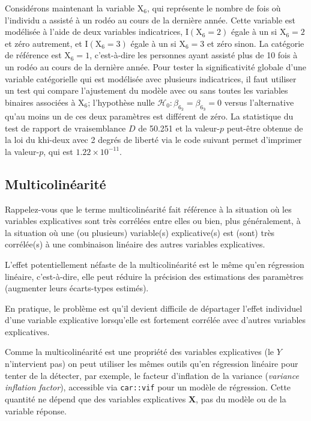 \documentclass[
  11pt,
  letterpaper,
]{scrbook}
\theoremstyle{definition}
\theoremstyle{remark}
\begin{document}
Considérons maintenant la variable \(\mathrm{X}_6\), qui représente le
nombre de fois où l'individu a assisté à un rodéo au cours de la
dernière année. Cette variable est modélisée à l'aide de deux variables
indicatrices, \(\mathrm{I}(\mathrm{X}_6=2)\) égale à un si
\(\mathrm{X}_6=2\) et zéro autrement, et \(\mathrm{I}(\mathrm{X}_6=3)\)
égale à un si \(\mathrm{X}_6=3\) et zéro sinon. La catégorie de
référence est \(\mathrm{X}_6=1\), c'est-à-dire les personnes ayant
assisté plus de 10 fois à un rodéo au cours de la dernière année. Pour
tester la significativité globale d'une variable catégorielle qui est
modélisée avec plusieurs indicatrices, il faut utiliser un test qui
compare l'ajustement du modèle avec ou sans toutes les variables
binaires associées à \(\mathrm{X}_6\); l'hypothèse nulle
\(\mathscr{H}_0: \beta_{6_{\texttt{2}}}=\beta_{6_{\texttt{3}}}=0\)
versus l'alternative qu'au moins un de ces deux paramètres est différent
de zéro. La statistique du test de rapport de vraisemblance \(D\) de
50.251 et la valeur-\(p\) peut-être obtenue de la loi du khi-deux avec 2
degrés de liberté via le code suivant permet d'imprimer la valeur-\(p\),
qui est \(1.22 \times 10^{-11}\).

\subsection{Multicolinéarité}\label{multicolinuxe9arituxe9}

Rappelez-vous que le terme multicolinéarité fait référence à la
situation où les variables explicatives sont très corrélées entre elles
ou bien, plus généralement, à la situation où une (ou plusieurs)
variable(s) explicative(s) est (sont) très corrélée(s) à une combinaison
linéaire des autres variables explicatives.

L'effet potentiellement néfaste de la multicolinéarité est le même qu'en
régression linéaire, c'est-à-dire, elle peut réduire la précision des
estimations des paramètres (augmenter leurs écarts-types estimés).

En pratique, le problème est qu'il devient difficile de départager
l'effet individuel d'une variable explicative lorsqu'elle est fortement
corrélée avec d'autres variables explicatives.

Comme la multicolinéarité est une propriété des variables explicatives
(le \(Y\) n'intervient pas) on peut utiliser les mêmes outils qu'en
régression linéaire pour tenter de la détecter, par exemple, le facteur
d'inflation de la variance (\emph{variance inflation factor}),
accessible via \texttt{car::vif} pour un modèle de régression. Cette
quantité ne dépend que des variables explicatives \(\mathbf{X}\), pas du
modèle ou de la variable réponse.
\end{document}
